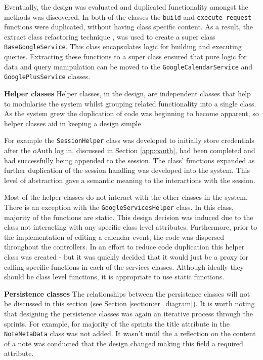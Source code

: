 Eventually, the design was evaluated and duplicated functionality amongst the methods was discovered. In both of the classes the \texttt{build} and \texttt{execute\_request} functions were duplicated, without having class specific content. As a result, the extract class refactoring technique \cite{citeulike:14023810}, was used to create a super class \texttt{BaseGoogleService}. This class encapsulates logic for building  and executing queries. Extracting these functions to a super class ensured that pure logic for data and query manipulation can be moved to the \texttt{GoogleCalendarService} and \texttt{GooglePlusService} classes.


\noindent
\textbf{Helper classes}
\newline
Helper classes, in the design, are independent classes that help to modularise the system whilst grouping related functionality into a single class. As the system grew the duplication of code was beginning to become apparent, so helper classes aid in keeping a design simple.

For example the \texttt{SessionHelper} class was developed to initially store credentials after the oAuth log in, discussed in Section \ref{app:oauth}, had been completed and had successfully being appended to the session. The class' functions expanded as further duplication of the session handling was developed into the system.  This level of abstraction gave a semantic meaning to the interactions with the session.

Most of the helper classes do not interact with the other classes in the system. There is an exception with the \texttt{GoogleServicesHelper} class. In this class, majority of the functions are static. This design decision was induced due to the class not interacting with any specific class level attributes. Furthermore, prior to the implementation of editing a calendar event, the code was dispersed throughout the controllers. In an effort to reduce code duplication this helper class was created - but it was quickly decided that it would just be a proxy for calling specific functions in each of the services classes. Although ideally they should be class level functions, it is appropriate to use static functions.

\noindent
\textbf{Persistence classes}
\newline
The relationships between the persistence classes will not be discussed in this section (see Section \ref{section:er_diagram}). It is worth noting that designing the persistence classes was again an iterative process through the sprints. For example, for majority of the sprints the title attribute in the \texttt{NoteMetaData} class was not added. It wasn't until the a reflection on the content of a note was conducted that the design changed making this field a required attribute.

